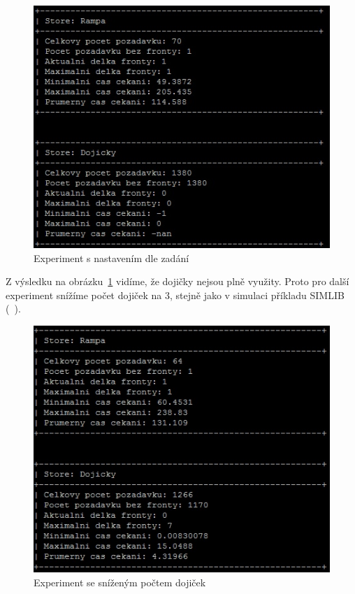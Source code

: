 \documentclass[12pt,a4paper,titlepage,final]{article}
\begin{document}
\begin{figure}[!h] 
 	\centering
	 \includegraphics[]{kravy1.jpg}
\caption{Experiment s nastavením dle zadání}
\label{obr1}
\end{figure}

Z výsledku na obrázku~\ref{obr1} vidíme, že dojičky nejsou plně využity. Proto pro další experiment snížíme počet dojiček na 3, stejně jako v simulaci příkladu  SIMLIB (~\cite{priklady}).

\begin{figure}[!h] 
 	\centering
	 \includegraphics[]{kravy2.jpg}
\caption{Experiment se sníženým počtem dojiček}
\label{obr2}
\end{figure}
\end{document}
